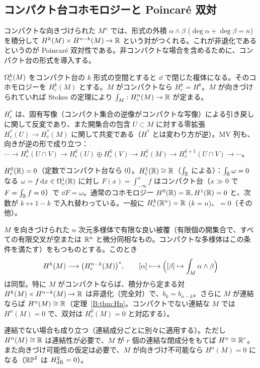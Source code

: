 \subsection{コンパクト台コホモロジーと Poincaré 双対}\label{B:ss:PD}

コンパクトな向きづけられた $M^n$ では、形式の外積 $\alpha\wedge\beta$ ($\deg\alpha+\deg\beta=n$) を積分して $H^k(M)\times H^{n-k}(M)\to\mathbb R$ という対がつくれる。これが非退化であるというのが Poincaré 双対性である。非コンパクトな場合を含めるために、コンパクト台の形式を導入する。

\begin{defn}[コンパクト台コホモロジー]
$\Omega^k_c(M)$ をコンパクト台の $k$ 形式の空間とすると $\dd$ で閉じた複体になる。そのコホモロジーを $H^k_c(M)$ とする。$M$ がコンパクトなら $H^k_c=H^k$。$M$ が向きづけられていれば Stokes の定理により $\int_M:H^n_c(M)\to\mathbb R$ が定まる。
\end{defn}
$H^*_c$ は、固有写像（コンパクト集合の逆像がコンパクトな写像）による引き戻しに関して反変であり、また開集合の包含 $U\subset M$ に対する零拡張 $H^*_c(U)\to H^*_c(M)$ に関して共変である（$H^*$ とは変わり方が逆）。MV 列も、向きが逆の形で成り立つ：
$\cdots\to H^k_c(U\cap V)\to H^k_c(U)\oplus H^k_c(V)\to H^k_c(M)\to H^{k+1}_c(U\cap V)\to\cdots$\tC。

\begin{ex}[$\R$ のコンパクト台コホモロジー]\label{B:ex:Hc}
$H^0_c(\mathbb R)=0$（定数でコンパクト台なら $0$）。$H^1_c(\mathbb R)\cong\mathbb R$（$\int_\mathbb R$ による）：$\int_\mathbb R\omega=0$ なる $\omega=f\,\mathrm{d} x\in\Omega^1_c(\mathbb R)$ に対し $F(x)=\int_{-\infty}^xf$ はコンパクト台（$x\gg0$ で $F=\int_\mathbb R f=0$）で $\dd F=\omega$。通常のコホモロジー $H^0(\mathbb R)=\mathbb R,H^1(\mathbb R)=0$ と、次数が $k\leftrightarrow1-k$ で入れ替わっている。一般に $H^k_c(\mathbb R^n)=\mathbb R$ ($k=n$)、$=0$（その他）\tC。
\end{ex}

\begin{thm}[Poincaré 双対]\label{B:thm:PD}\tC
$M$ を向きづけられた $n$ 次元多様体で有限な良い被覆（有限個の開集合で、すべての有限交叉が空または $\mathbb R^n$ と微分同相なもの。コンパクトな多様体はこの条件を満たす）をもつものとする。このとき
\[
H^k(M)\longrightarrow\bigl(H^{n-k}_c(M)\bigr)^*,\qquad[\alpha]\longmapsto\Bigl([\beta]\mapsto\int_M\alpha\wedge\beta\Bigr)
\]
は同型。特に $M$ がコンパクトならば、積分から定まる対 $H^k(M)\times H^{n-k}(M)\to\mathbb R$ は非退化（完全対）で、$b_k=b_{n-k}$。さらに $M$ が連結ならば $H^n(M)\cong\mathbb R$（定理~\ref{B:thm:Hn}。コンパクトでない連結な $M$ では $H^n(M)=0$ で、双対は $H^0_c(M)=0$ と対応する）。
\end{thm}
\begin{rem}
連結でない場合も成り立つ（連結成分ごとに別々に適用する）。ただし $H^n(M)\cong\mathbb R$ は連結性が必要で、$M$ が $r$ 個の連結な閉成分をもてば $H^n\cong\mathbb R^r$。また向きづけ可能性の仮定は必要で、$M$ が向きづけ不可能なら $H^n(M)=0$ になる（$\mathbb{RP}^2$ は $H^2_{\rm dR}=0$）。
\end{rem}

